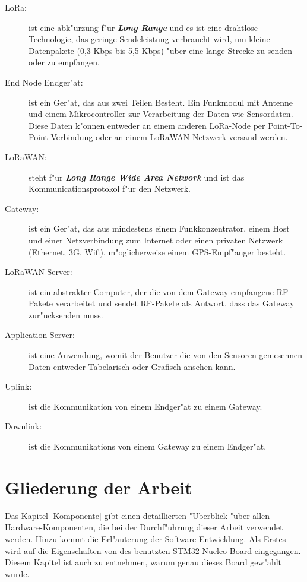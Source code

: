 \begin{description}
	\item[LoRa:] ist eine abk"urzung f"ur \textbf{\textit{Long Range}} und es ist eine drahtlose Technologie, das geringe Sendeleistung verbraucht wird, um kleine Datenpakete (0,3 Kbps bis 5,5 Kbps) "uber eine lange Strecke zu senden oder zu empfangen.    
	
	\item[End Node Endger"at:] ist ein Ger"at, das aus zwei Teilen Besteht. Ein Funkmodul mit Antenne und einem Mikrocontroller zur Verarbeitung der Daten wie Sensordaten. Diese Daten k"onnen entweder an einem anderen LoRa-Node per Point-To-Point-Verbindung oder an einem LoRaWAN-Netzwerk versand werden.

	\item[LoRaWAN:] steht f"ur \textbf{\textit{Long Range Wide Area Network}} und ist das Kommunicationsprotokol f"ur den Netzwerk.
	
	\item[Gateway:] ist ein Ger"at, das aus mindestens einem Funkkonzentrator, einem Host und einer Netzverbindung zum Internet oder einen privaten Netzwerk (Ethernet, 3G, Wifi), m"oglicherweise einem GPS-Empf"anger besteht.
	
	\item[LoRaWAN Server:] ist ein abstrakter Computer, der die von dem Gateway empfangene RF-Pakete verarbeitet und sendet RF-Pakete als Antwort, dass das Gateway zur"ucksenden muss.
	
	\item[Application Server:] ist eine Anwendung, womit der Benutzer die von den Sensoren gemesennen Daten entweder Tabelarisch oder Grafisch ansehen kann.
	
	\item[Uplink:] ist die Kommunikation von einem Endger"at zu einem Gateway. 
	
	\item[Downlink:] ist die Kommunikations von einem Gateway zu einem Endger"at.
\end{description}

\vspace{8cm}
\section{Gliederung der Arbeit}

Das Kapitel \ref{Komponente} gibt einen detaillierten "Uberblick "uber allen Hardware-Komponenten, die bei der Durchf"uhrung dieser Arbeit verwendet werden. Hinzu kommt die Erl"auterung der Software-Entwicklung. Als Erstes wird auf die Eigenschaften von des benutzten STM32-Nucleo Board eingegangen. Diesem Kapitel ist auch zu entnehmen, warum genau dieses Board gew"ahlt wurde. 

